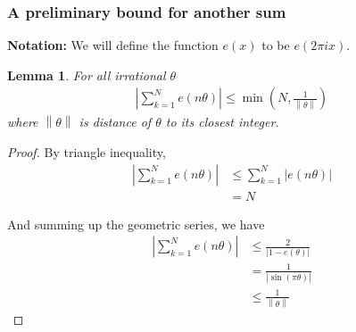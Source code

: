 \documentclass[12pt, titlepage]{article}
\newtheorem{lem}[thm]{Lemma}
\theoremstyle{definition}
\newcommand{\norm}[1]{\left\lVert#1\right\rVert}
\begin{document}
\subsubsection{A preliminary bound for another sum}
\textbf{Notation:} We will define the function $e(x)$ to be $e(2\pi i x)$.

\begin{lem}
    For all irrational $\theta$
    \begin{align}
    \displaystyle \left| \sum_{k=1}^{N} e(n\theta) \right| \leq \min\left(N, \frac{1}{\norm{\theta}} \right) \label{bound:1}
    \end{align}
    where $\norm{\theta}$ is distance of $\theta$ to its closest integer.
\end{lem}

\begin{proof}
    By triangle inequality,
    \begin{align*}
        \left| \sum_{k=1}^{N} e(n\theta) \right| & \leq \sum_{k=1}^{N} \left| e(n\theta) \right| \\
        &= N
    \end{align*}
    
    And summing up the geometric series, we have
    \begin{align*}
        \left| \sum_{k=1}^{N} e(n\theta) \right| &\leq \frac{2}{\left| 1- e(\theta) \right|} \\
        &= \frac{1}{\left| \sin(\pi \theta) \right|}\\
        &\leq \frac{1}{\norm{\theta}}
    \end{align*}
\end{proof}
 
\end{document}
